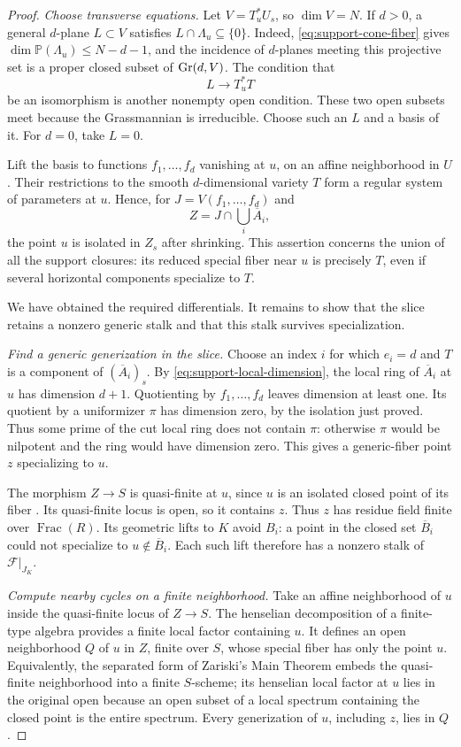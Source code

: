 \begin{proof}
\emph{Choose transverse equations.}
Let $V=T_u^*U_s$, so $\dim V=N$.  If $d>0$, a general $d$-plane
$L\subset V$ satisfies $L\cap\Lambda_u\subseteq\{0\}$.  Indeed,
\eqref{eq:support-cone-fiber} gives
$\dim\mathbb P(\Lambda_u)\leq N-d-1$, and the incidence of
$d$-planes meeting this projective set is a proper closed subset of
$\operatorname{Gr}(d,V)$.  The condition that
\[
 L\longrightarrow T_u^*T
\]
be an isomorphism is another nonempty open condition.  These two open
subsets meet because the Grassmannian is irreducible.  Choose such an
$L$ and a basis of it.  For $d=0$, take $L=0$.

Lift the basis to functions $f_1,\ldots,f_d$ vanishing at $u$, on an
affine neighborhood in $U$.  Their restrictions to the smooth
$d$-dimensional variety $T$ form a regular system of parameters at $u$.
Hence, for $J=V(f_1,\ldots,f_d)$ and
\[
 Z=J\cap\bigcup_i\overline A_i,
\]
the point $u$ is isolated in $Z_s$ after shrinking.  This assertion
concerns the union of all the support closures: its reduced special
fiber near $u$ is precisely $T$, even if several horizontal components
specialize to $T$.

We have obtained the required differentials.  It remains to show that
the slice retains a nonzero generic stalk and that this stalk survives
specialization.

\emph{Find a generic generization in the slice.}
Choose an index $i$ for which $e_i=d$ and $T$ is a component of
$(\overline A_i)_s$.  By \eqref{eq:support-local-dimension}, the local
ring of $\overline A_i$ at $u$ has dimension $d+1$.  Quotienting by
$f_1,\ldots,f_d$ leaves dimension at least one.  Its quotient by a
uniformizer $\pi$ has dimension zero, by the isolation just proved.
Thus some prime of the cut local ring does not contain $\pi$:
otherwise $\pi$ would be nilpotent and the ring would have dimension
zero.  This gives a generic-fiber point $z$ specializing to $u$.

The morphism $Z\to S$ is quasi-finite at $u$, since $u$ is an isolated
closed point of its fiber \cite[Tag~01TH]{Stacks}.  Its quasi-finite
locus is open, so it contains $z$.  Thus $z$ has residue field finite
over $\operatorname{Frac}(R)$.  Its geometric lifts to $K$ avoid
$B_i$: a point in the closed set $\overline B_i$ could not specialize
to $u\notin\overline B_i$.  Each such lift therefore has a nonzero
stalk of $\mathcal F|_{J_K}$.

\emph{Compute nearby cycles on a finite neighborhood.}
Take an affine neighborhood of $u$ inside the quasi-finite locus of
$Z\to S$.  The henselian decomposition of a finite-type algebra
\cite[Tag~04GJ]{Stacks} provides a finite local factor containing $u$.
It defines an open neighborhood $Q$ of $u$ in $Z$, finite over $S$,
whose special fiber has only the point $u$.  Equivalently, the
separated form of Zariski's Main Theorem embeds the quasi-finite
neighborhood into a finite $S$-scheme; its henselian local factor at
$u$ lies in the original open because an open subset of a local
spectrum containing the closed point is the entire spectrum.
Every generization of $u$, including $z$, lies in $Q$.


\end{proof}
